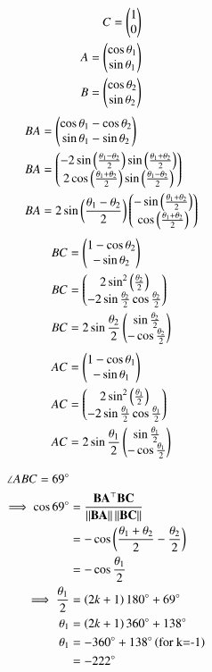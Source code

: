 \documentclass[journal,12pt,twocolumn]{IEEEtran}
\begin{document}
\begin{enumerate}
		\begin{align}
			C = \begin{pmatrix}1\\0\end{pmatrix}\\
			A = \begin{pmatrix}\cos \theta_1\\\sin \theta_1\end{pmatrix}\\
			B = \begin{pmatrix}\cos \theta_2\\\sin \theta_2\end{pmatrix}
		\end{align}
		\begin{align}
			BA &= \begin{pmatrix}\cos \theta_1 - \cos \theta_2\\\sin \theta_1-\sin \theta_2\end{pmatrix}\\
			BA &= \begin{pmatrix}-2\sin \left(\frac{\theta_1-\theta_2}{2}\right) \sin \left(\frac{\theta_1+\theta_2}{2}\right)\\2\cos \left(\frac{\theta_1+\theta_2}{2}\right)\sin \left(\frac{\theta_1-\theta_2}{2}\right)\end{pmatrix}\\
			BA &= 2\sin \left(\frac{\theta_1-\theta_2}{2}\right)\begin{pmatrix}-\sin \left(\frac{\theta_1+\theta_2}{2}\right)\\\cos \left(\frac{\theta_1+\theta_2}{2}\right)\end{pmatrix}
		\end{align}
		\begin{align}
			BC &= \begin{pmatrix}1-\cos \theta_2\\-\sin \theta_2\end{pmatrix}\\
			BC &= \begin{pmatrix}2\sin^2 \left(\frac{\theta_2}{2}\right)\\-2\sin \frac{\theta_2}{2}\cos \frac{\theta_2}{2}\end{pmatrix}\\
			BC &= 2\sin \frac{\theta_2}{2} \begin{pmatrix}\sin \frac{\theta_2}{2}\\-\cos \frac{\theta_2}{2}\end{pmatrix}
		\end{align}
		\begin{align}
			AC &= \begin{pmatrix}1-\cos \theta_1\\-\sin \theta_1\end{pmatrix}\\
			AC &= \begin{pmatrix}2\sin^2 \left(\frac{\theta_1}{2}\right)\\-2\sin \frac{\theta_1}{2}\cos \frac{\theta_1}{2}\end{pmatrix}\\
			AC &= 2\sin \frac{\theta_1}{2} \begin{pmatrix}\sin \frac{\theta_1}{2}\\-\cos \frac{\theta_1}{2}\end{pmatrix}
		\end{align}

		\begin{align}
			\angle ABC=69 \degree \\
			\implies \cos 69\degree &= \frac{\mathbf{BA}^{\top}\mathbf{BC}}{\left\lVert\mathbf{BA}\right\rVert\left\lVert\mathbf{BC}\right\rVert}\\
												 						 &= -\cos \left(\frac{\theta_1+\theta_2}{2}-\frac{\theta_2}{2}\right)\\
						&= -\cos \frac{\theta_1}{2}\\
		    \implies \frac{\theta_1}{2} &= \left(2k+1\right)180\degree +69\degree \\
		                       \theta_1 &= \left(2k+1\right)360\degree + 138\degree \\
				       \theta_1 &= -360\degree +138\degree \left(\text{for k=-1}\right)\\
				  	        &=-222\degree 
		\end{align}


\end{enumerate}
\end{document}
